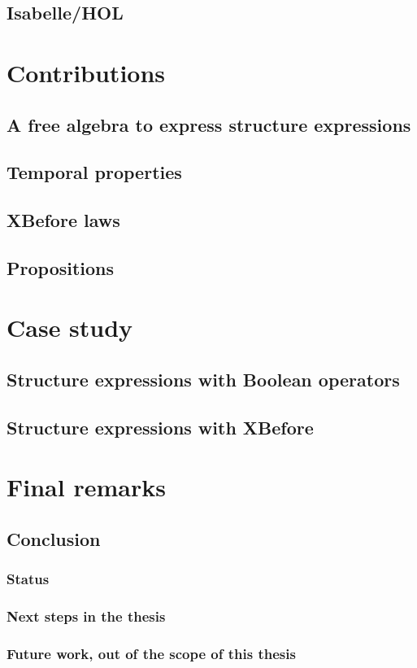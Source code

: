 \documentclass{beamer}
\begin{document}
\subsection{Isabelle/HOL}

\section{Contributions}
\subsection{A free algebra to express structure expressions}
\subsection{Temporal properties}
\subsection{XBefore laws}
\subsection{Propositions}

\section{Case study}
\subsection{Structure expressions with Boolean operators}
\subsection{Structure expressions with XBefore}

\section{Final remarks}
\subsection{Conclusion}

\begin{frame}
\frametitle{Status}
\end{frame}

\begin{frame}
\frametitle{Next steps in the thesis}
\end{frame}

\begin{frame}
\frametitle{Future work, out of the scope of this thesis}
\end{frame}

\end{document}
